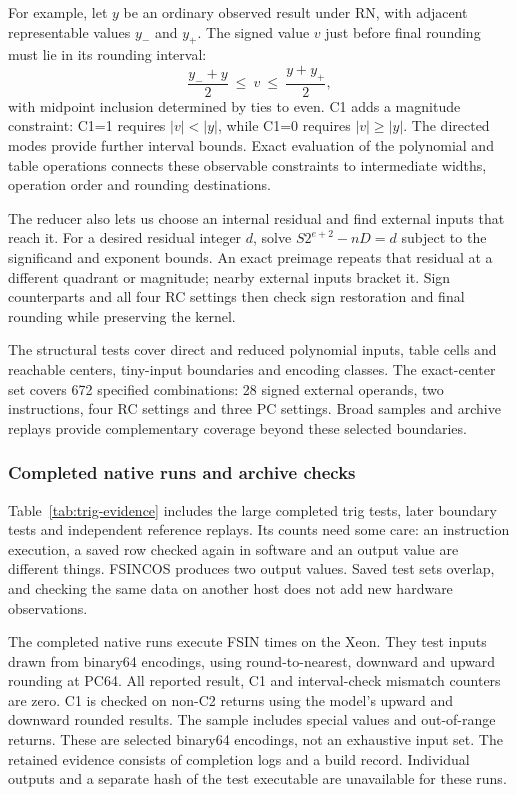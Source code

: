 \documentclass[11pt]{article}
\begin{document}
For example, let $y$ be an ordinary observed result under RN, with adjacent
representable values $y_-$ and $y_+$. The signed value $v$ just before final
rounding must lie in its rounding interval:
\begin{equation}
 \frac{y_-+y}{2}\ \leq\ v\ \leq\ \frac{y+y_+}{2},
\end{equation}
with midpoint inclusion determined by ties to even. C1 adds a magnitude
constraint: C1=1 requires $|v|<|y|$, while C1=0 requires $|v|\geq|y|$.
The directed modes provide further interval bounds. Exact evaluation of the
polynomial and table operations connects these observable constraints to
intermediate widths, operation order and rounding destinations.

The reducer also lets us choose an internal residual and find external
inputs that reach it. For a desired residual integer $d$, solve
$S2^{e+2}-nD=d$ subject to the significand and exponent bounds. An exact
preimage repeats that residual at a different quadrant or magnitude; nearby
external inputs bracket it. Sign counterparts and all four RC settings
then check sign restoration and final rounding while preserving the kernel.

The structural tests cover direct and reduced polynomial inputs, table cells
and reachable centers, tiny-input boundaries and encoding classes. The
exact-center set covers 672 specified combinations: 28 signed external
operands, two instructions, four RC settings and three PC settings. Broad
samples and archive replays provide complementary coverage beyond these
selected boundaries.

\subsubsection{Completed native runs and archive checks}

Table~\ref{tab:trig-evidence} includes the large completed trig tests, later
boundary tests and independent reference replays. Its counts need some care:
an instruction execution, a saved row checked again in software and an
output value are different things. FSINCOS produces two output values.
Saved test sets overlap, and checking the same data on another host does not
add new hardware observations.



The completed native runs execute FSIN \TrigNativeRows{} times on the
Xeon. They test \TrigNativeInputs{} inputs drawn from binary64 encodings,
using round-to-nearest, downward and upward rounding at PC64. All reported
result, C1 and interval-check mismatch
counters are zero. C1 is checked on non-C2 returns using the model's
upward and downward rounded results. The sample includes special values
and out-of-range returns. These are selected binary64 encodings, not an
exhaustive input set. The retained evidence consists of completion logs
and a build record. Individual outputs and a separate hash of the test
executable are unavailable for these runs.
\end{document}
